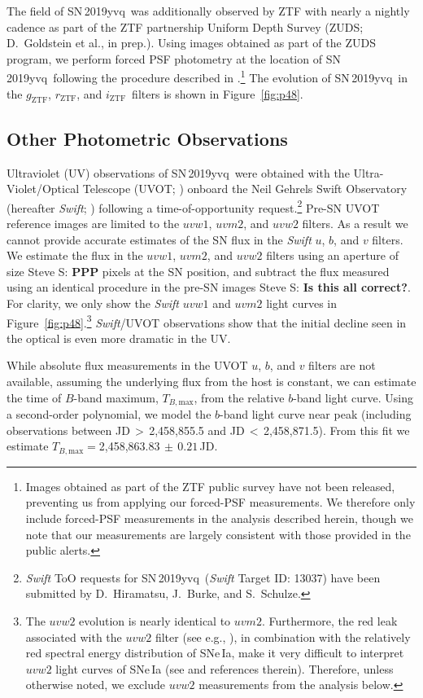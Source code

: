 \documentclass[twocolumn]{aastex63}
\newcommand{\steve}[1]{{\color{DarkCyan} Steve S: \textbf{#1}}}
\newcommand{\rztf}{$r_\mathrm{ZTF}$}
\newcommand{\gztf}{$g_\mathrm{ZTF}$}
\newcommand{\iztf}{$i_\mathrm{ZTF}$}
\newcommand{\tbmax}{$T_{B,\mathrm{max}}$}
\newcommand{\sn}{SN\,2019yvq}
\begin{document}
The field of \sn\ was additionally observed by ZTF with nearly a nightly
cadence as part of the ZTF partnership Uniform Depth Survey (ZUDS;
D.~Goldstein et al., in prep.). Using images obtained as part of the ZUDS
program, we perform forced PSF photometry at the location of \sn\ following
the procedure described in \citet{Yao19}.\footnote{Images obtained as part of
the ZTF public survey have not been released, preventing us from applying our
forced-PSF measurements. We therefore only include forced-PSF measurements in
the analysis described herein, though we note that our measurements are
largely consistent with those provided in the public alerts.} The evolution
of \sn\ in the \gztf, \rztf, and \iztf\ filters is shown in
Figure~\ref{fig:p48}.

\subsection{Other Photometric Observations}\label{sec:swift}

Ultraviolet (UV) observations of \sn\ were obtained with the
Ultra-Violet/Optical Telescope (UVOT; \citealt{Roming05}) onboard the Neil
Gehrels Swift Observatory (hereafter \textit{Swift}; \citealt{Gehrels04})
following a time-of-opportunity request.\footnote{\textit{Swift} ToO
requests for \sn\ (\textit{Swift} Target ID: 13037) have been submitted by
D.~Hiramatsu, J.~Burke, and S.~Schulze.}
Pre-SN UVOT reference images are limited to the $uvw1$, $uvm2$, and $uvw2$
filters. As a result we cannot provide accurate estimates of the SN flux in
the \textit{Swift} $u$, $b$, and $v$ filters. We estimate the flux in the
$uvw1$, $uvm2$, and $uvw2$ filters using an aperture of size \steve{PPP}
pixels at the SN position, and subtract the flux measured using an identical
procedure in the pre-SN images \steve{Is this all correct?}. For clarity, we
only show the \textit{Swift} $uvw1$ and $uvm2$ light curves in
Figure~\ref{fig:p48}.\footnote{The $uvw2$ evolution is nearly identical to
$uvm2$. Furthermore, the red leak associated with the $uvw2$ filter (see
e.g., \citealt{Breeveld11}), in combination with the relatively red spectral
energy distribution of SNe\,Ia, make it very difficult to interpret $uvw2$
light curves of SNe\,Ia (see \citealt{Brown17} and references therein).
Therefore, unless otherwise noted, we exclude $uvw2$ measurements from the
analysis below.} \textit{Swift}/UVOT observations show that the initial
decline seen in the optical is even more dramatic in the UV.

While absolute flux measurements in the UVOT $u$, $b$, and $v$ filters are
not available, assuming the underlying flux from the host is constant, we
can estimate the time of $B$-band maximum, \tbmax, from the relative
$b$-band light curve. Using a second-order polynomial, we model the $b$-band
light curve near peak (including observations between JD$\,> \,$2,458,855.5
and JD$\,<\,$2,458,871.5). From this fit we estimate \tbmax$ =
$2,458,863.83$ \,\pm \,0.21$\,JD.
\end{document}
